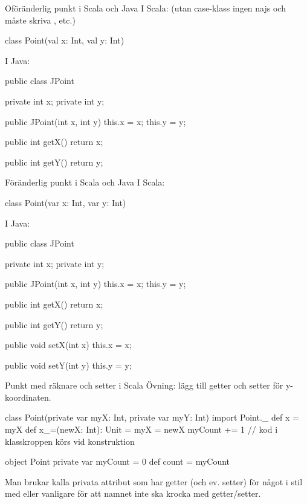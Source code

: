 
\begin{Slide}{Oföränderlig punkt  i Scala och Java}\SlideFontSmall
I Scala: (utan case-klass ingen najs  och måste skriva , etc.)
\begin{Code}
class Point(val x: Int, val y: Int)
\end{Code}

I Java:
\begin{Code}[language=Java,basicstyle=\ttfamily\SlideFontSize{5.8}{7}]
public class JPoint {
    private int x;
    private int y;

    public JPoint(int x, int y){
        this.x = x;
        this.y = y;
    }  
    
    public int getX(){
        return x;
    }
    
    public int getY(){
        return y;
    }
}
\end{Code}
\end{Slide}

\begin{Slide}{Föränderlig punkt  i Scala och Java}\SlideFontSmall
I Scala: 
\begin{Code}
class Point(var x: Int, var y: Int)
\end{Code}

I Java:
\begin{Code}[language=Java,basicstyle=\ttfamily\SlideFontSize{5.2}{6}]
public class JPoint {
    private int x;
    private int y;

    public JPoint(int x, int y){
        this.x = x;
        this.y = y;
    }  
    
    public int getX(){
        return x;
    }
    
    public int getY(){
        return y;
    }
    
    public void setX(int x){
        this.x = x;
    }
    
    public void setY(int y){
        this.y = y;
    }    
}
\end{Code}
\end{Slide}

\begin{Slide}{Punkt med räknare och setter i Scala}
Övning: lägg till getter och setter för y-koordinaten.
\begin{Code}
class Point(private var myX: Int, private var myY: Int){
  import Point._
  def x = myX
  def x_=(newX: Int): Unit = {
    myX = newX
  }
  myCount += 1   // kod i klasskroppen körs vid konstruktion
}

object Point {
  private var myCount = 0
  def count = myCount
}
\end{Code}
\SlideFontSmall
Man brukar kalla privata attribut som har getter (och ev. setter) för något i stil med  eller vanligare  för att namnet inte ska krocka med getter/setter.
\end{Slide}



